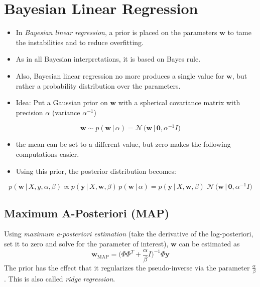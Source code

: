 \documentclass[a4paper, 11pt, accentcolor = tud3b]{tudreport}
\newcommand{\given}{\ensuremath{\,\vert\,}}
\renewcommand{\vec}[1]{\mathbf{#1}}
\begin{document}
		\section{Bayesian Linear Regression}
			\begin{itemize}
				\item In \emph{Bayesian linear regression}, a prior is placed on the parameters \(\vec{w}\) to tame the instabilities and to reduce overfitting.
				\item As in all Bayesian interpretations, it is based on Bayes rule.
				\item Also, Bayesian linear regression no more produces a single value for \(\vec{w}\), but rather a probability distribution over the parameters.
				\item Idea: Put a Gaussian prior on \(\vec{w}\) with a spherical covariance matrix with precision \( \alpha \) (variance \(\alpha^{-1}\))
			\end{itemize}
			\begin{equation}
				\vec{w} \sim p(\vec{w} \given \alpha) = \mathcal{N}\,\big(\vec{w} \given \vec{0}, \alpha^{-1} I\big)
			\end{equation}
			\begin{itemize}
				\item[] the mean can be set to a different value, but zero makes the following computations easier.
				\item Using this prior, the posterior distribution becomes:
			\end{itemize}
			\begin{equation}
				p(\vec{w} \given X, y, \alpha, \beta) \propto p(\vec{y} \given X, \vec{w}, \beta) \, p(\vec{w} \given \alpha) = p(\vec{y} \given X, \vec{w}, \beta) \,\,\mathcal{N}\,\big(\vec{w} \given \vec{0}, \alpha^{-1} I\big)
			\end{equation}

			\subsection{Maximum A-Posteriori (MAP)}
				Using \emph{maximum a-posteriori estimation} (take the derivative of the log-posteriori, set it to zero and solve for the parameter of interest), \(\vec{w}\) can be estimated as
				\begin{equation}
					\vec{w}_\textrm{MAP} = \Bigg(\! \Phi\Phi^T + \frac{\alpha}{\beta} I \!\Bigg)^{-1} \Phi \vec{y}
				\end{equation}
				The prior has the effect that it regularizes the pseudo-inverse via the parameter \( \frac{\alpha}{\beta} \). This is also called \emph{ridge regression}.
\end{document}
